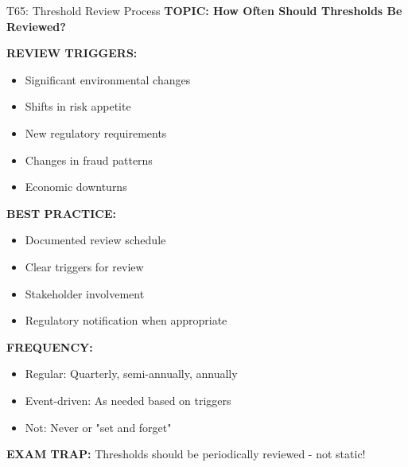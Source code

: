 \documentclass[8pt]{beamer}
\begin{document}
	\begin{frame}{T65: Threshold Review Process}
		\fontsize{6.5}{7.5}\selectfont
		\textbf{TOPIC: How Often Should Thresholds Be Reviewed?}
		
		\vspace{0.1cm}
		\textbf{REVIEW TRIGGERS:}
		\begin{itemize}
			\item Significant environmental changes
			\item Shifts in risk appetite
			\item New regulatory requirements
			\item Changes in fraud patterns
			\item Economic downturns
		\end{itemize}
		
		\vspace{0.1cm}
		\textbf{BEST PRACTICE:}
		\begin{itemize}
			\item Documented review schedule
			\item Clear triggers for review
			\item Stakeholder involvement
			\item Regulatory notification when appropriate
		\end{itemize}
		
		\vspace{0.1cm}
		\textbf{FREQUENCY:}
		\begin{itemize}
			\item \textcolor{myblue}{Regular:} Quarterly, semi-annually, annually
			\item \textcolor{myblue}{Event-driven:} As needed based on triggers
			\item \textcolor{myblue}{Not:} Never or "set and forget"
		\end{itemize}
		
		\textcolor{myred}{\textbf{EXAM TRAP:}} Thresholds should be \textcolor{myblue}{periodically reviewed} - not static!
	\end{frame}
	
	
\end{document}
